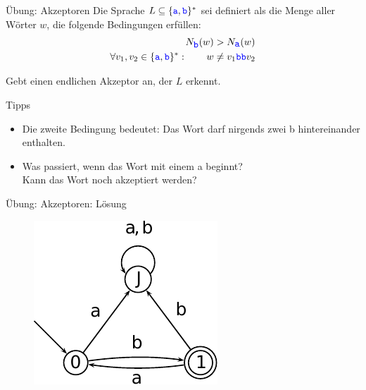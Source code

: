 






\begin{frame}{Übung: Akzeptoren}
	Die Sprache $L\subseteq \{\hbox{\textcolor{blue}{\texttt{a}}},\hbox{\textcolor{blue}{\texttt{b}}}\}^\ast $ sei definiert als die Menge aller Wörter $w$, die folgende Bedingungen erfüllen:
	\begin{align*}
		N_{\hbox{\textcolor{blue}{\texttt{b}}}}(w) &> N_{\hbox{\textcolor{blue}{\texttt{a}}}}(w)\\ 
		\forall v_1,v_2 \in \{\hbox{\textcolor{blue}{\texttt{a}}},\hbox{\textcolor{blue}{\texttt{b}}}\}^\ast : \qquad w &\neq v_1 \hbox{\textcolor{blue}{\texttt{bb}}} v_2 
	\end{align*}
	
	Gebt einen endlichen Akzeptor an, der $L$ erkennt. \\
	
	\bigskip
	\pause
	\begin{block}{Tipps}
		\begin{itemize}[<+->]
			\item Die zweite Bedingung bedeutet: Das Wort darf nirgends zwei \word b hintereinander enthalten.
			\item Was passiert, wenn das Wort mit einem \word a beginnt?\\
				  Kann das Wort noch akzeptiert werden?
		\end{itemize}
	\end{block}
\end{frame}

\begin{frame}{Übung: Akzeptoren: Lösung}
	\begin{figure}
		\centering
		\includegraphics[width=0.7\linewidth]{automaten/Loesung2.pdf}
	\end{figure}
\end{frame}

